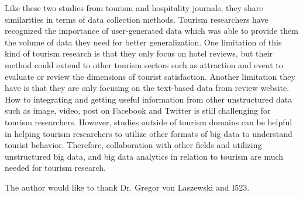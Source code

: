 \documentclass[sigconf]{acmart}
\begin{document}
Like these two studies from tourism and hospitality journals, they share similarities
in terms of data collection methods. Tourism researchers have recognized the
importance of user-generated data which was able to provide them the volume of data
they need for better generalization. One limitation of this kind of tourism research
is that they only focus on hotel reviews, but their method could extend to other
tourism sectors such as attraction and event to evaluate or review the dimensions of
tourist satisfaction. Another limitation they have is that they are only focusing on
the text-based data from review website. How to integrating and getting useful
information from other unstructured data such as image, video, post on Facebook and
Twitter is still challenging for tourism researchers. However, studies outside of
tourism domains can be helpful in helping tourism researchers to utilize other formats
of big data to understand tourist behavior. Therefore, collaboration with other fields
and utilizing unstructured big data, and big data analytics in relation to tourism are
much needed for tourism research. 


\begin{acks}

  The author would like to thank Dr. Gregor von Laszewski and I523.

\end{acks}


 
\end{document}
